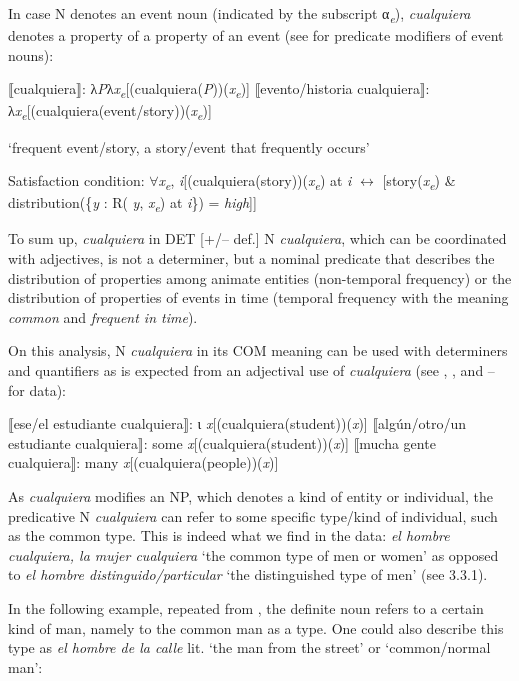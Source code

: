 {In case N denotes an event noun (indicated by the subscript α\textit{\textsubscript{e}}), \textit{cualquiera} denotes a property of a property of an event (see \citealt{GehrkeMcNally2015} for predicate modifiers of event nouns):

\ea \label{ex:key:161} %
\ea  ⟦cualquiera⟧: λ\textit{P}λ\textit{x\textsubscript{e}}[(cualquiera(\textit{P}))(\textit{x\textsubscript{e}})]
\ex ⟦evento/historia cualquiera⟧: λ\textit{x\textsubscript{e}}[(cualquiera(event/story))(\textit{x\textsubscript{e}})]

    \glt ‘frequent event/story, a story/event that frequently occurs’

  Satisfaction condition:
\ex ${\forall}$\textit{x\textsubscript{e}}, \textit{i}[(cualquiera(story))(\textit{x\textsubscript{e}}) at \textit{i} $\leftrightarrow $ [story(\textit{x\textsubscript{e}}) \& distribution(\{\textit{y} : R( \textit{y}, \textit{x\textsubscript{e}}) at \textit{i}\}) = \textit{high}]]
\z
\z

To sum up, \textit{cualquiera} in DET [+/– def.] N \textit{cualquiera}, which can be coordinated with adjectives, is not a determiner, but a nominal predicate that describes the distribution of properties among animate entities (non-temporal frequency) or the distribution of properties of events in time (temporal frequency with the meaning \textit{common} and \textit{frequent in time}).

On this analysis, N \textit{cualquiera} in its COM meaning can be used with determiners and quantifiers as is expected from an adjectival use of \textit{cualquiera} (see , , and – for data):

\ea \label{ex:key:162} %
\ea  ⟦ese/el estudiante cualquiera⟧: ι \textit{x}[(cualquiera(student))(\textit{x})]
\ex ⟦algún/otro/un estudiante cualquiera⟧: some \textit{x}[(cualquiera(student))(\textit{x})]
\ex ⟦mucha gente cualquiera⟧: many \textit{x}[(cualquiera(people))(\textit{x})]
\z
\z

As \textit{cualquiera} modifies an NP, which denotes a kind of entity or individual, the predicative N \textit{cualquiera} can refer to some specific type/kind of individual, such as the common type. This is indeed what we find in the data: \textit{el hombre cualquiera, la mujer cualquiera} ‘the common type of men or women’ as opposed to \textit{el hombre distinguido/particular} ‘the distinguished type of men’ (see 3.3.1).

In the following example, repeated from , the definite noun refers to a certain kind of man, namely to the common man {as a type}. One could also describe this type as \textit{el hombre de la calle} lit. ‘the man from the street’ or ‘common/normal man’:

}
